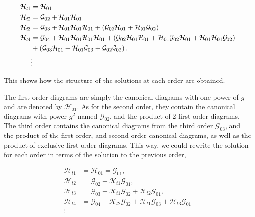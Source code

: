 \documentclass[11pt,a4paper,twoside,pdf]{article}
\numberwithin{equation}{section}
\begin{document}
\begin{align}
    \mathcal{H}_{t1} & = \mathcal{H}_{01} \\
    \mathcal{H}_{t2} & = \mathcal{G}_{02} + \mathcal{H}_{01} 
    \mathcal{H}_{01}\\
    \mathcal{H}_{t3} & = \mathcal{G}_{03} + \mathcal{H}_{01} \mathcal{H}_{01}
    \mathcal{H}_{01} + \left( \mathcal{G}_{02} \mathcal{H}_{01} + 
    \mathcal{H}_{01} \mathcal{G}_{02} \right)\\
    \mathcal{H}_{t4} & = \mathcal{G}_{04} + \mathcal{H}_{01} \mathcal{H}_{01}
    \mathcal{H}_{01} \mathcal{H}_{01} + \left( \mathcal{G}_{02} 
    \mathcal{H}_{01} \mathcal{H}_{01} +  \mathcal{H}_{01} \mathcal{G}_{02}
    \mathcal{H}_{01} + \mathcal{H}_{01} \mathcal{H}_{01} \mathcal{G}_{02} \right) \nonumber\\
    & + \left( \mathcal{G}_{03} \mathcal{H}_{01} + \mathcal{H}_{01} 
    \mathcal{G}_{03} + \mathcal{G}_{02}\mathcal{G}_{02} \right). \\
    &\vdots  \nonumber
\end{align}

This shows how the structure of the solutions at each order are obtained. 

The first-order diagrams are simply the canonical diagrams with one power of $g$ and are
denoted by $\mathcal{H}_{01}$. As for the second order, they contain the canonical diagrams 
with power $g^2$ named $\mathcal{G}_{02}$, and the product of 2 first-order diagrams. The 
third order contains the canonical diagrams from the third order $\mathcal{G}_{03}$,
and the product of the first order, and second order canonical diagrams, as well as the 
product of exclusive first order diagrams. This way, we could rewrite the solution for 
each order in terms of the solution to the previous order,

\begin{align}
    \mathcal{H}_{t1} & = \mathcal{H}_{01} = \mathcal{G}_{01}, \\
    \mathcal{H}_{t2} & = \mathcal{G}_{02} + \mathcal{H}_{t1} \mathcal{G}_{01}, \\
    \mathcal{H}_{t3} & = \mathcal{G}_{03} + \mathcal{H}_{t1} \mathcal{G}_{02} + 
    \mathcal{H}_{t2} \mathcal{G}_{01}, \\
    \mathcal{H}_{t4} & = \mathcal{G}_{04} + \mathcal{H}_{t2} \mathcal{G}_{02} + 
    \mathcal{H}_{t1} \mathcal{G}_{03} + \mathcal{H}_{t3} \mathcal{G}_{01} \label{eq:sol_order4}\\
    \vdots & \nonumber
\end{align}
\end{document}
